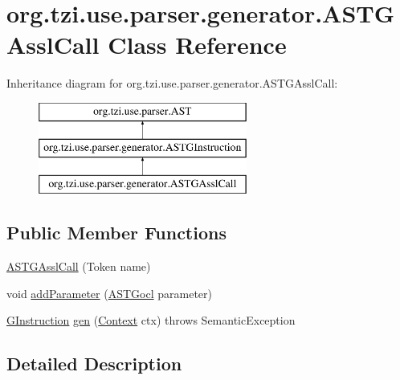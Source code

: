\hypertarget{classorg_1_1tzi_1_1use_1_1parser_1_1generator_1_1_a_s_t_g_assl_call}{\section{org.\-tzi.\-use.\-parser.\-generator.\-A\-S\-T\-G\-Assl\-Call Class Reference}
\label{classorg_1_1tzi_1_1use_1_1parser_1_1generator_1_1_a_s_t_g_assl_call}
}
Inheritance diagram for org.\-tzi.\-use.\-parser.\-generator.\-A\-S\-T\-G\-Assl\-Call\-:\begin{figure}[H]
\begin{center}
\leavevmode
\includegraphics[height=3.000000cm]{classorg_1_1tzi_1_1use_1_1parser_1_1generator_1_1_a_s_t_g_assl_call}
\end{center}
\end{figure}
\subsection*{Public Member Functions}
\begin{DoxyCompactItemize}
\item 
\hyperlink{classorg_1_1tzi_1_1use_1_1parser_1_1generator_1_1_a_s_t_g_assl_call_aaff87735f86fbd26e058d92d5684a15e}{A\-S\-T\-G\-Assl\-Call} (Token name)
\item 
void \hyperlink{classorg_1_1tzi_1_1use_1_1parser_1_1generator_1_1_a_s_t_g_assl_call_a18294b43439e3b535d6befbe5c56c4d9}{add\-Parameter} (\hyperlink{classorg_1_1tzi_1_1use_1_1parser_1_1generator_1_1_a_s_t_gocl}{A\-S\-T\-Gocl} parameter)
\item 
\hyperlink{interfaceorg_1_1tzi_1_1use_1_1gen_1_1assl_1_1statics_1_1_g_instruction}{G\-Instruction} \hyperlink{classorg_1_1tzi_1_1use_1_1parser_1_1generator_1_1_a_s_t_g_assl_call_a372bd3e8f45eebb753a0fead49cd56ed}{gen} (\hyperlink{classorg_1_1tzi_1_1use_1_1parser_1_1_context}{Context} ctx)  throws Semantic\-Exception 
\end{DoxyCompactItemize}


\subsection{Detailed Description}


